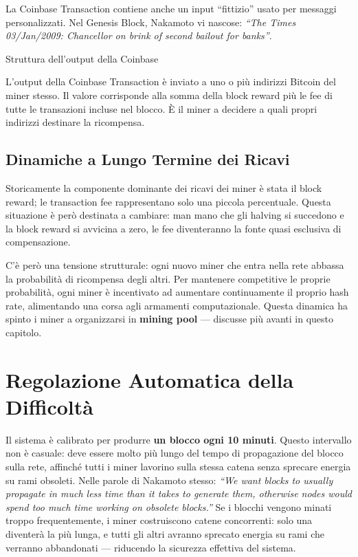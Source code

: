 \documentclass[
  italian,
  openany]{book}
\begin{document}
La Coinbase Transaction contiene anche un input ``fittizio'' usato per
messaggi personalizzati. Nel Genesis Block, Nakamoto vi nascose:
\emph{``The Times 03/Jan/2009: Chancellor on brink of second bailout for
banks''}.

\begin{calloutnote}{Struttura dell’output della Coinbase}

L'output della Coinbase Transaction è inviato a uno o più indirizzi
Bitcoin del miner stesso. Il valore corrisponde alla somma della block
reward più le fee di tutte le transazioni incluse nel blocco. È il miner
a decidere a quali propri indirizzi destinare la ricompensa.

\end{calloutnote}

\subsection{Dinamiche a Lungo Termine dei
Ricavi}\label{dinamiche-a-lungo-termine-dei-ricavi}

Storicamente la componente dominante dei ricavi dei miner è stata il
block reward; le transaction fee rappresentano solo una piccola
percentuale. Questa situazione è però destinata a cambiare: man mano che
gli halving si succedono e la block reward si avvicina a zero, le fee
diventeranno la fonte quasi esclusiva di compensazione.

C'è però una tensione strutturale: ogni nuovo miner che entra nella rete
abbassa la probabilità di ricompensa degli altri. Per mantenere
competitive le proprie probabilità, ogni miner è incentivato ad
aumentare continuamente il proprio hash rate, alimentando una corsa agli
armamenti computazionale. Questa dinamica ha spinto i miner a
organizzarsi in \textbf{mining pool} --- discusse più avanti in questo
capitolo.

\section{Regolazione Automatica della
Difficoltà}\label{regolazione-automatica-della-difficoltuxe0}

Il sistema è calibrato per produrre \textbf{un blocco ogni 10 minuti}.
Questo intervallo non è casuale: deve essere molto più lungo del tempo
di propagazione del blocco sulla rete, affinché tutti i miner lavorino
sulla stessa catena senza sprecare energia su rami obsoleti. Nelle
parole di Nakamoto stesso: \emph{``We want blocks to usually propagate
in much less time than it takes to generate them, otherwise nodes would
spend too much time working on obsolete blocks.''} Se i blocchi vengono
minati troppo frequentemente, i miner costruiscono catene concorrenti:
solo una diventerà la più lunga, e tutti gli altri avranno sprecato
energia su rami che verranno abbandonati --- riducendo la sicurezza
effettiva del sistema.
\end{document}
